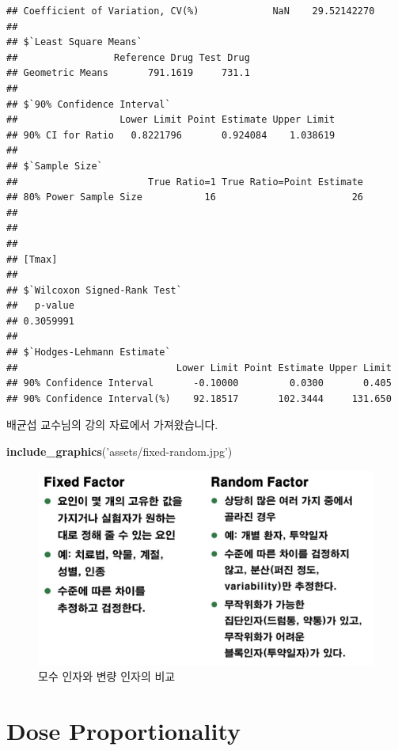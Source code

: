 \documentclass[12pt,]{krantz}
\newenvironment{Shaded}{\begin{snugshade}}{\end{snugshade}}
\newcommand{\KeywordTok}[1]{\textcolor[rgb]{0.13,0.29,0.53}{\textbf{#1}}}
\newcommand{\StringTok}[1]{\textcolor[rgb]{0.31,0.60,0.02}{#1}}
\newcommand{\NormalTok}[1]{#1}
\theoremstyle{definition}
\theoremstyle{definition}
\theoremstyle{definition}
\theoremstyle{remark}
\begin{document}
\begin{verbatim}
## Coefficient of Variation, CV(%)             NaN    29.52142270
## 
## $`Least Square Means`
##                 Reference Drug Test Drug
## Geometric Means       791.1619     731.1
## 
## $`90% Confidence Interval`
##                  Lower Limit Point Estimate Upper Limit
## 90% CI for Ratio   0.8221796       0.924084    1.038619
## 
## $`Sample Size`
##                       True Ratio=1 True Ratio=Point Estimate
## 80% Power Sample Size           16                        26
## 
## 
## 
## [Tmax]
## 
## $`Wilcoxon Signed-Rank Test`
##   p-value 
## 0.3059991 
## 
## $`Hodges-Lehmann Estimate`
##                            Lower Limit Point Estimate Upper Limit
## 90% Confidence Interval       -0.10000         0.0300       0.405
## 90% Confidence Interval(%)    92.18517       102.3444     131.650
\end{verbatim}

배균섭 교수님의 강의 자료에서 가져왔습니다.

\begin{Shaded}
\begin{Highlighting}[]
\KeywordTok{include_graphics}\NormalTok{(}\StringTok{'assets/fixed-random.jpg'}\NormalTok{)}
\end{Highlighting}
\end{Shaded}

\begin{figure}
\includegraphics[width=16.86in]{assets/fixed-random} \caption{모수 인자와 변량 인자의 비교}\label{fig:fixedrandom}
\end{figure}

\section{Dose Proportionality}\label{dp}
\end{document}
